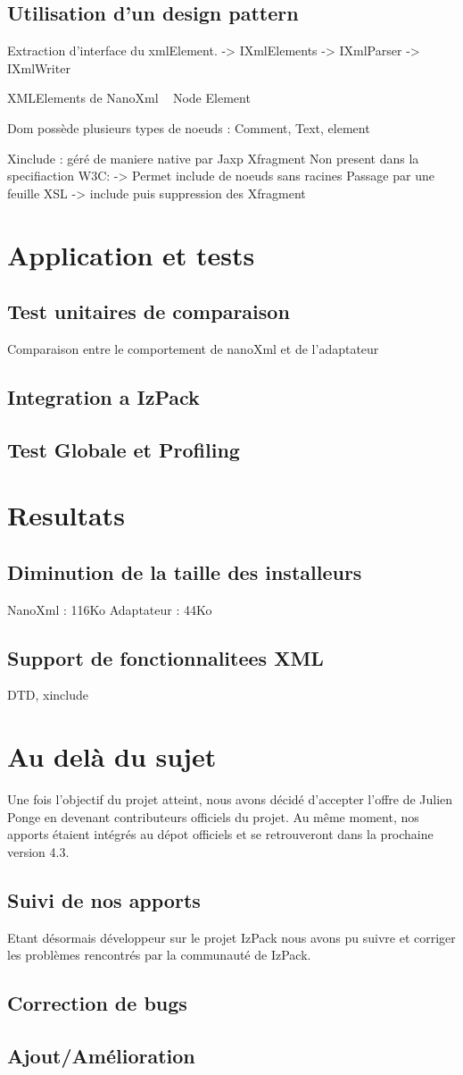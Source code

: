 \subsection{Utilisation d'un design pattern}
Extraction d'interface du xmlElement.
-> IXmlElements
-> IXmlParser
-> IXmlWriter

XMLElements de NanoXml ~ Node Element

Dom possède plusieurs types de noeuds : Comment, Text, element

Xinclude : géré de maniere native par Jaxp
Xfragment Non present dans la specifiaction W3C:
-> Permet include de noeuds sans racines
Passage par une feuille XSL
-> include puis suppression des Xfragment
\section{Application et tests}
\subsection{Test unitaires de comparaison}
Comparaison entre le comportement de nanoXml et de l'adaptateur
\subsection{Integration a IzPack}
\subsection{Test Globale et Profiling}

\section{Resultats}
\subsection{Diminution de la taille des installeurs}
NanoXml : 116Ko
Adaptateur : 44Ko
\subsection{Support de fonctionnalitees XML}
DTD, xinclude

\section{Au delà du sujet}
Une fois l'objectif du projet atteint, nous avons décidé d'accepter l'offre de Julien Ponge en devenant contributeurs officiels du projet. Au même moment, nos apports étaient intégrés au dépot officiels et se retrouveront dans la prochaine version 4.3.

\subsection{Suivi de nos apports}
Etant désormais développeur sur le projet IzPack nous avons pu suivre et corriger les problèmes rencontrés par la communauté de IzPack.

\subsection{Correction de bugs}

\subsection{Ajout/Amélioration}
